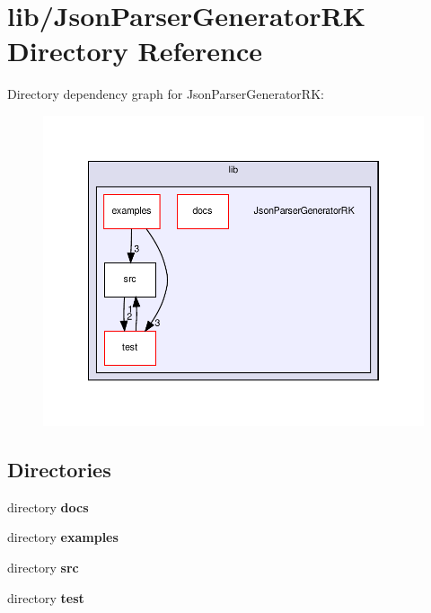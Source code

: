 \section{lib/\+Json\+Parser\+Generator\+RK Directory Reference}
\label{dir_5a67b15dd7d4ea74c0455493ec289812}
Directory dependency graph for Json\+Parser\+Generator\+RK\+:\nopagebreak
\begin{figure}[H]
\begin{center}
\leavevmode
\includegraphics[width=350pt]{dir_5a67b15dd7d4ea74c0455493ec289812_dep}
\end{center}
\end{figure}
\subsection*{Directories}
\begin{DoxyCompactItemize}
\item 
directory \textbf{ docs}
\item 
directory \textbf{ examples}
\item 
directory \textbf{ src}
\item 
directory \textbf{ test}
\end{DoxyCompactItemize}
